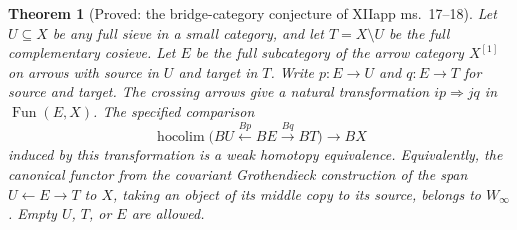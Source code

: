 \documentclass[11pt,a4paper]{article}
\newtheorem{theorem}{Theorem}[section]
\theoremstyle{definition}
\theoremstyle{remark}
\newcommand{\Winfty}{W_\infty}
\newcommand{\hocolim}{\operatorname*{hocolim}}
\newcommand{\Fun}{\operatorname{Fun}}
\begin{document}
\begin{theorem}[Proved: the bridge-category conjecture of XIIapp ms.~17--18]\label{G:bridge}
Let $U\subseteq X$ be any full sieve in a small category, and let $T=X\setminus U$ be the full complementary cosieve. Let $E$ be the full subcategory of the arrow category $X^{[1]}$ on arrows with source in $U$ and target in $T$. Write $p:E\to U$ and $q:E\to T$ for source and target. The crossing arrows give a natural transformation $ip\Rightarrow jq$ in $\Fun(E,X)$. The specified comparison
\[
 \hocolim\bigl(BU\xleftarrow{Bp}BE\xrightarrow{Bq}BT\bigr)
 \longrightarrow BX
\]
induced by this transformation is a weak homotopy equivalence. Equivalently, the canonical functor from the covariant Grothendieck construction of the span $U\leftarrow E\to T$ to $X$, taking an object of its middle copy to its source, belongs to $\Winfty$. Empty $U$, $T$, or $E$ are allowed.
\end{theorem}
\end{document}
